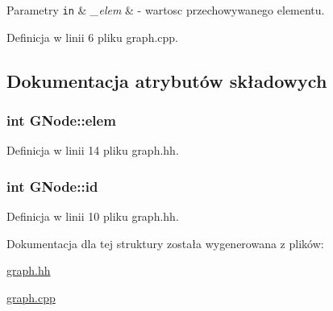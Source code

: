 \begin{DoxyParams}[1]{Parametry}
\mbox{\tt in}  & {\em \-\_\-elem} & -\/ wartosc przechowywanego elementu. \\
\hline
\end{DoxyParams}


Definicja w linii 6 pliku graph.\-cpp.



\subsection{Dokumentacja atrybutów składowych}
\hypertarget{struct_g_node_ad817c61fd9230c7f4c623a3ff7c315e8}{
\subsubsection[{elem}]{\setlength{\rightskip}{0pt plus 5cm}int G\-Node\-::elem}}\label{struct_g_node_ad817c61fd9230c7f4c623a3ff7c315e8}


Definicja w linii 14 pliku graph.\-hh.

\hypertarget{struct_g_node_a014544c8bb3e0011425d69ebafa25937}{
\subsubsection[{id}]{\setlength{\rightskip}{0pt plus 5cm}int G\-Node\-::id}}\label{struct_g_node_a014544c8bb3e0011425d69ebafa25937}


Definicja w linii 10 pliku graph.\-hh.



Dokumentacja dla tej struktury została wygenerowana z plików\-:\begin{DoxyCompactItemize}
\item 
\hyperlink{graph_8hh}{graph.\-hh}\item 
\hyperlink{graph_8cpp}{graph.\-cpp}\end{DoxyCompactItemize}
